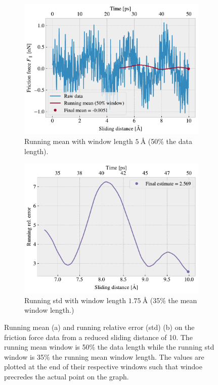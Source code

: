 \begin{figure}[H]
  \centering
  \begin{subfigure}[t]{0.49\textwidth}
    \centering
    \includegraphics[width=\textwidth]{figures/baseline/Ff_runmean.pdf}
    \caption{Running mean with window length $\SI{5}{\text{Å}}$ (50\% the data length).}
    \label{fig:runmean}
  \end{subfigure}
  \hfill
  \begin{subfigure}[t]{0.49\textwidth}
      \centering
      \includegraphics[width=\textwidth]{figures/baseline/Ff_runstd.pdf}
      \caption{Running std with window length $\SI{1.75}{\text{Å}}$ (35\% the mean window length.)}
      \label{fig:runstd}
  \end{subfigure}
  \caption{Running mean (a) and running relative error (std) (b) on the friction force data from a reduced sliding distance of \SI{10}{{}}. The running mean window is 50\% the data length while the running std window is 35\% the running mean window length. The values are plotted at the end of their respective windows such that windoe precredes the actual point on the graph.}
  \label{fig:running}
\end{figure}

